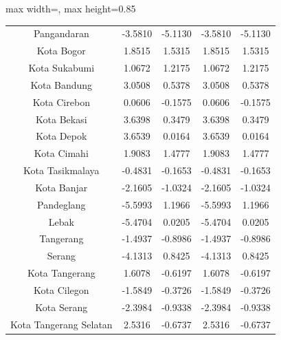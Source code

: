 \begin{table}[H]
\begin{adjustbox}{max width=\textwidth, max height=0.85\textheight}
\begin{tabular}{|c|c|c|c|c|}
Pangandaran & -3.5810 & -5.1130 & -3.5810 & -5.1130 \\
Kota Bogor & 1.8515 & 1.5315 & 1.8515 & 1.5315 \\
Kota Sukabumi & 1.0672 & 1.2175 & 1.0672 & 1.2175 \\
Kota Bandung & 3.0508 & 0.5378 & 3.0508 & 0.5378 \\
Kota Cirebon & 0.0606 & -0.1575 & 0.0606 & -0.1575 \\
Kota Bekasi & 3.6398 & 0.3479 & 3.6398 & 0.3479 \\
Kota Depok & 3.6539 & 0.0164 & 3.6539 & 0.0164 \\
Kota Cimahi & 1.9083 & 1.4777 & 1.9083 & 1.4777 \\
Kota Tasikmalaya & -0.4831 & -0.1653 & -0.4831 & -0.1653 \\
Kota Banjar & -2.1605 & -1.0324 & -2.1605 & -1.0324 \\
Pandeglang & -5.5993 & 1.1966 & -5.5993 & 1.1966 \\
Lebak & -5.4704 & 0.0205 & -5.4704 & 0.0205 \\
Tangerang & -1.4937 & -0.8986 & -1.4937 & -0.8986 \\
Serang & -4.1313 & 0.8425 & -4.1313 & 0.8425 \\
Kota Tangerang & 1.6078 & -0.6197 & 1.6078 & -0.6197 \\
Kota Cilegon & -1.5849 & -0.3726 & -1.5849 & -0.3726 \\
Kota Serang & -2.3984 & -0.9338 & -2.3984 & -0.9338 \\
Kota Tangerang Selatan & 2.5316 & -0.6737 & 2.5316 & -0.6737 \\
\hline
\end{tabular}
\end{adjustbox}
\end{table}